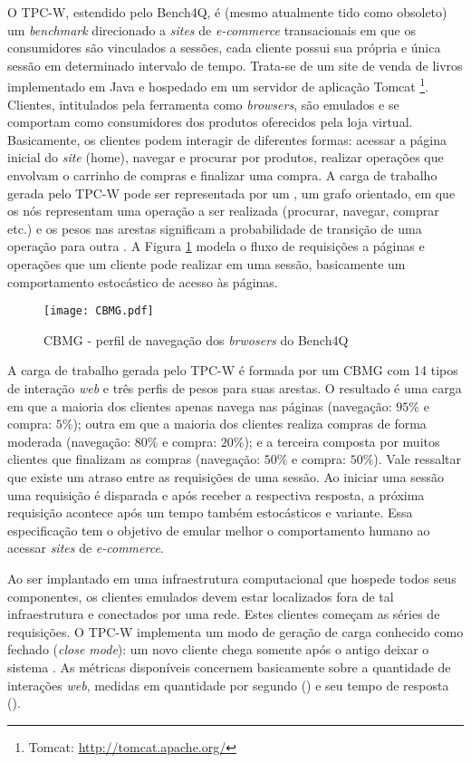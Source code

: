 O TPC-W, estendido pelo Bench4Q, é (mesmo atualmente tido como obsoleto) um \textit{ benchmark} direcionado a \textit{sites} de \textit{e-commerce} transacionais em que os consumidores são vinculados a sessões, cada cliente possui sua própria e única sessão em determinado intervalo de tempo. Trata-se de um site de venda de livros implementado em Java e hospedado em um servidor de aplicação Tomcat \footnote{Tomcat: \url{http://tomcat.apache.org/}}. Clientes, intitulados pela ferramenta como \textit{browsers}, são emulados e se comportam como consumidores dos produtos oferecidos pela loja virtual. Basicamente, os clientes podem interagir de diferentes formas: acessar a página inicial do \textit{site} (home), navegar e procurar por produtos, realizar operações que envolvam o carrinho de compras e finalizar uma compra. A carga de trabalho gerada pelo TPC-W pode ser representada por um , um grafo orientado, em que os nós representam uma operação a ser realizada (procurar, navegar, comprar etc.) e os pesos nas arestas significam a probabilidade de transição de uma operação para outra \cite{Zhang2011}. A Figura \ref{fig:CBMG} modela o fluxo de requisições a páginas e operações que um cliente pode realizar em uma sessão, basicamente um comportamento estocástico de acesso às páginas.

\begin{figure}[htb]
	\centering
	\texttt{[image: CBMG.pdf]}
	\caption{CBMG - perfil de navegação dos \textit{brwosers} do Bench4Q}
	\label{fig:CBMG}
\end{figure}


A carga de trabalho gerada pelo TPC-W é formada por um CBMG com 14 tipos de interação \textit{web} e três perfis de pesos para suas arestas. O resultado é uma carga em que a maioria dos clientes apenas navega nas páginas (navegação: $95\%$ e compra: $5\%$); outra em que a maioria dos clientes realiza compras de forma moderada (navegação: $80\%$ e compra: $20\%$); e a terceira composta por muitos clientes que finalizam as compras (navegação: $50\%$ e compra: $50\%$). Vale ressaltar que existe um atraso entre as requisições de uma sessão. Ao iniciar uma sessão uma requisição é disparada e após receber a respectiva resposta, a próxima requisição acontece após um tempo também estocásticos e variante. Essa especificação tem o objetivo de emular melhor o comportamento humano ao acessar \textit{sites} de \textit{ e-commerce}.

Ao ser implantado em uma infraestrutura computacional que hospede todos seus componentes, os clientes emulados devem estar localizados fora de tal infraestrutura e conectados por uma rede. Estes clientes começam as séries de requisições. O TPC-W implementa um modo de geração de carga conhecido como fechado (\textit{close mode}): um novo cliente chega somente após o antigo deixar o sistema \cite{Zhang2011}. As métricas disponíveis concernem basicamente sobre a quantidade de interações \textit{web}, medidas em quantidade por segundo () e seu tempo de resposta ().


